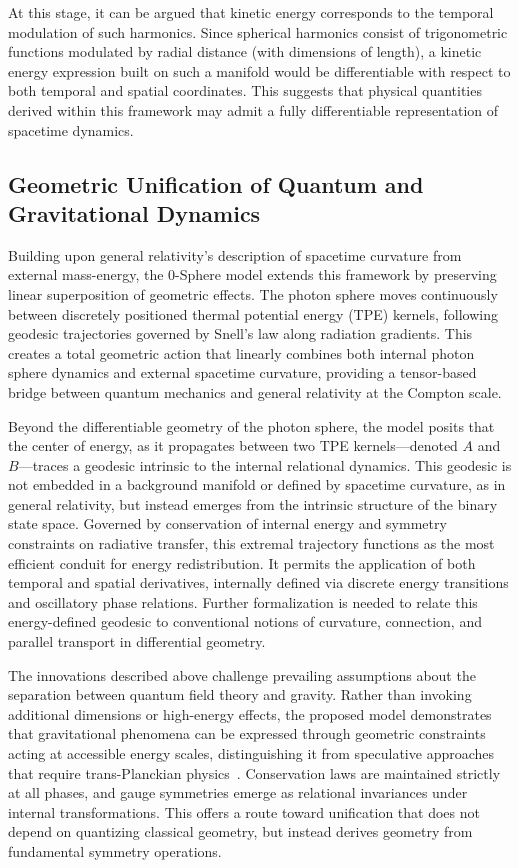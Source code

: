 \documentclass[%
 reprint,
 amsmath,amssymb,
 aps,
]{revtex4-1}
\numberwithin{equation}{section}%
\begin{document}
At this stage, it can be argued that kinetic energy corresponds to the temporal modulation of such harmonics. Since spherical harmonics consist of trigonometric functions modulated by radial distance (with dimensions of length), a kinetic energy expression built on such a manifold would be differentiable with respect to both temporal and spatial coordinates. This suggests that physical quantities derived within this framework may admit a fully differentiable representation of spacetime dynamics.

\subsection{Geometric Unification of Quantum and Gravitational Dynamics}
\label{subsec:geometric_unification}

Building upon general relativity's description of spacetime curvature from external mass-energy, the 0-Sphere model extends this framework by preserving linear superposition of geometric effects. The photon sphere moves continuously between discretely positioned thermal potential energy (TPE) kernels, following geodesic trajectories governed by Snell's law along radiation gradients. This creates a total geometric action that linearly combines both internal photon sphere dynamics and external spacetime curvature, providing a tensor-based bridge between quantum mechanics and general relativity at the Compton scale.

Beyond the differentiable geometry of the photon sphere, the model posits that the center of energy, as it propagates between two TPE kernels—denoted $A$ and $B$—traces a geodesic intrinsic to the internal relational dynamics. This geodesic is not embedded in a background manifold or defined by spacetime curvature, as in general relativity, but instead emerges from the intrinsic structure of the binary state space. Governed by conservation of internal energy and symmetry constraints on radiative transfer, this extremal trajectory functions as the most efficient conduit for energy redistribution. It permits the application of both temporal and spatial derivatives, internally defined via discrete energy transitions and oscillatory phase relations. Further formalization is needed to relate this energy-defined geodesic to conventional notions of curvature, connection, and parallel transport in differential geometry.

The innovations described above challenge prevailing assumptions about the separation between quantum field theory and gravity. Rather than invoking additional dimensions or high-energy effects, the proposed model demonstrates that gravitational phenomena can be expressed through geometric constraints acting at accessible energy scales, distinguishing it from speculative approaches that require trans-Planckian physics~\cite{amelino-camelia2002}. Conservation laws are maintained strictly at all phases, and gauge symmetries emerge as relational invariances under internal transformations. This offers a route toward unification that does not depend on quantizing classical geometry, but instead derives geometry from fundamental symmetry operations.
\end{document}
